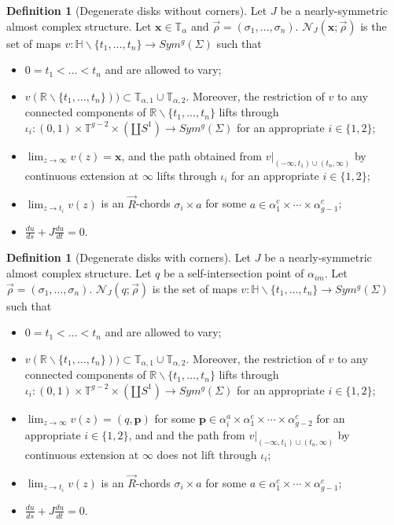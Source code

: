 \documentclass{amsart}
\theoremstyle{definition}
\newtheorem{defn}[thm]{Definition}
\theoremstyle{remark}
\numberwithin{equation}{section}
\numberwithin{equation}{section} \makeatletter
\begin{document}
\begin{defn}[Degenerate disks without corners]
Let $J$ be a nearly-symmetric almost complex structure. Let $\bm{x}\in \mathbb{T}_{\alpha}$ and $\overrightarrow{\rho}=(\sigma_1,\ldots,\sigma_n)$. $\mathcal{N}_J(\bm{x};\overrightarrow{\rho})$ is the set of maps $v:\mathbb{H}\backslash\{t_1,\ldots,t_n\}\rightarrow Sym^g(\Sigma)$ such that 
\begin{itemize}
\item[(1)]$0=t_1<\ldots<t_n$ and are allowed to vary;
\item[(2)]$v(\mathbb{R}\backslash \{t_1,\ldots,t_n\}))\subset \mathbb{T}_{\alpha,1}\cup \mathbb{T}_{\alpha,2}$. Moreover, the restriction of $v$ to any connected components of $\mathbb{R}\backslash \{t_1,\ldots,t_n\}$ lifts through $\iota_i:(0,1)\times \mathbb{T}^{g-2}\times (\amalg S^1)\rightarrow Sym^g(\Sigma)$ for an appropriate $i\in\{1,2\}$;
\item[(3)]$\lim_{z\rightarrow \infty}v(z)=\bm{x}$, and the path obtained from $v|_{(-\infty,t_1)\cup (t_n,\infty)}$ by continuous extension at $\infty$ lifts through $\iota_i$ for an appropriate $i\in\{1,2\}$;
\item[(4)]$\lim_{z\rightarrow t_i}v(z)$ is an $\overrightarrow{R}$-chords $\sigma_i\times a$ for some $a\in \alpha_1^c\times\cdots\times \alpha_{g-1}^c$;
\item[(5)]$\frac{du}{ds}+J\frac{du}{dt}=0$.
\end{itemize}
\end{defn}
\begin{defn}[Degenerate disks with corners]
Let $J$ be a nearly-symmetric almost complex structure. Let $q$ be a self-intersection point of $\alpha_{im}$. Let $\overrightarrow{\rho}=(\sigma_1,\ldots,\sigma_n)$. $\mathcal{N}_J(q;\overrightarrow{\rho})$ is the set of maps $v:\mathbb{H}\backslash\{t_1,\ldots,t_n\}\rightarrow Sym^g(\Sigma)$ such that 
\begin{itemize}
\item[(1)]$0=t_1<\ldots<t_n$ and are allowed to vary;
\item[(2)]$v(\mathbb{R}\backslash \{t_1,\ldots,t_n\}))\subset \mathbb{T}_{\alpha,1}\cup \mathbb{T}_{\alpha,2}$. Moreover, the restriction of $v$ to any connected components of $\mathbb{R}\backslash \{t_1,\ldots,t_n\}$ lifts through $\iota_i:(0,1)\times \mathbb{T}^{g-2} \times (\amalg S^1)\rightarrow Sym^g(\Sigma)$ for an appropriate $i\in\{1,2\}$;
\item[(3)]$\lim_{z\rightarrow \infty}v(z)=(q,\bm{p})$ for some $\bm{p}\in \alpha^a_i\times\alpha_1^c\times\cdots\times \alpha_{g-2}^c$ for an appropriate $i\in\{1,2\}$, and and the path from $v|_{(-\infty,t_1)\cup (t_n,\infty)}$ by continuous extension at $\infty$ does not lift through $\iota_i$;
\item[(4)]$\lim_{z\rightarrow t_i}v(z)$ is an $\overrightarrow{R}$-chords $\sigma_i\times a$ for some $a\in \alpha_1^c\times\cdots\times \alpha_{g-1}^c$;
\item[(5)]$\frac{du}{ds}+J\frac{du}{dt}=0$.
\end{itemize}
\end{defn}
\end{document}
